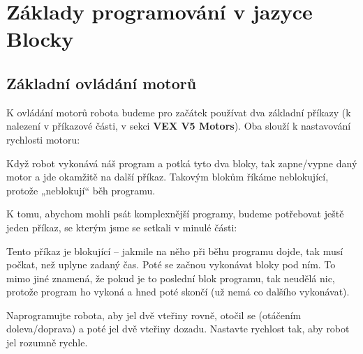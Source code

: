 \documentclass[../main.tex]{subfiles}
\begin{document}
	\section{Základy programování v jazyce Blocky}


	\subsection{Základní ovládání motorů}
	K ovládání motorů robota budeme pro začátek používat dva základní příkazy (k nalezení v příkazové části, v sekci \textbf{VEX V5 Motors}). Oba slouží k nastavování rychlosti motoru:
	\begin{itemize}
		\blockMotorStart
		\blockMotorStop
	\end{itemize}

	Když robot vykonává náš program a potká tyto dva bloky, tak zapne/vypne daný motor a jde okamžitě na další příkaz. Takovým blokům říkáme neblokující, protože „neblokují“ běh programu.

	K tomu, abychom mohli psát komplexnější programy, budeme potřebovat ještě jeden příkaz, se kterým jsme se setkali v minulé části:
	\begin{itemize}
		\blockWait
	\end{itemize}

	Tento příkaz je blokující -- jakmile na něho při běhu programu dojde, tak musí počkat, než uplyne zadaný čas. Poté se začnou vykonávat bloky pod ním. To mimo jiné znamená, že pokud je to poslední blok programu, tak neudělá nic, protože program ho vykoná a hned poté skončí (už nemá co dalšího vykonávat).

	\begin{question}\label{que:basic}%
		Naprogramujte robota, aby jel dvě vteřiny rovně, otočil se (otáčením doleva/doprava) a poté jel dvě vteřiny dozadu. Nastavte rychlost tak, aby robot jel rozumně rychle.
	\end{question}
\end{document}
